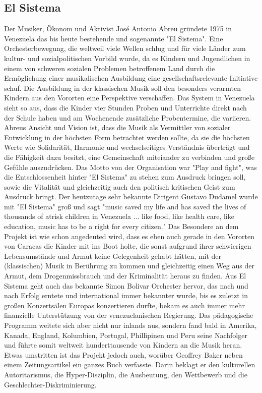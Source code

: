 \subsection{El Sistema}
Der Musiker, Ökonom und Aktivist José Antonio Abreu gründete 1975 in Venezuela
das bis heute bestehende und sogenannte "El Sistema". Eine Orchesterbewegung,
die weltweil viele Wellen schlug und für viele Länder zum kultur- und
sozialpolitischen Vorbild wurde, da es Kindern und Jugendlichen in einem von
schweren sozialen Problemen betroffenem Land durch die Ermöglichung einer
musikalischen Ausbildung eine gesellschaftsrelevante
Initiative schuf.
Die Ausbildung in der klassischen Musik soll den besonders verarmten Kindern aus den Vororten
eine Perspektive verschaffen. Das System in Venezuela sieht so aus, dass die
Kinder vier Stunden Proben und Unterrichte direkt nach der Schule haben und am
Wochenende zusätzliche Probentermine, die variieren. Abreus Ansicht und Vision ist, dass die
Musik als Vermittler von sozialer Entwicklung in der höchsten Form betrachtet
werden sollte, da sie die höchsten Werte wie Solidarität, Harmonie und
wechselseitiges Verständnis überträgt und die Fähigkeit dazu besitzt, eine
Gemeinschaft miteiander zu verbinden und große Gefühle auszudrücken. Das Motto
von der Organisation war "Play and fight", was die Entschlossenheit hinter "El
Sistema" zu stehen zum Ausdruck bringen soll, sowie die Vitalität und
gleichzeitig auch den politisch kritischen Geist zum Ausdruck bringt. Der
heutzutage sehr bekannte Dirigent Gustavo Dudamel wurde mit "El Sistema" groß
und sagt "music saved my life and has saved the lives of thousands of atrisk
children in Venezuela ... like food, like health care, like education, music has
to be a right for every citizen."%
Das Besondere an dem Projekt ist wie schon angedeuted wird, dass es eben auch
gerade in den Vororten von Caracas die Kinder mit ins Boot holte, die sonst
aufgrund ihrer schwierigen Lebensumstände und Armut keine Gelegenheit gehabt
hätten, mit der (klassischen) Musik in Berührung zu kommen und gleichzeitig
einen Weg aus der Armut, dem Drogenmissbrauch und der Kriminalität heraus zu
finden. Aus El Sistema geht auch das bekannte Simon Bolivar Orchester hervor,
das nach und nach Erfolg erntete und international
immer bekannter wurde, bis es zuletzt in großen Konzertsälen Europas
konzertieren durfte, bekam es auch immer mehr finanzielle Unterstützung von der
venezuelanischen Regierung. Das pädagogische Programm weitete sich aber nicht
nur inlands aus, sondern fand bald in Amerika, Kanada, England, Kolumbien,
Portugal, Phillipinen und Peru seine Nachfolger und führte somit weltweit
hunderttausende von Kindern an die Musik heran. Etwas umstritten ist das Projekt
jedoch auch, worüber Geoffrey Baker neben einem Zeitungsartikel ein ganzes
Buch verfasste. Darin beklagt er den kulturellen Autoritarismus, die
Hyper-Disziplin, die Ausbeutung, den Wettbewerb und die
Geschlechter-Diskriminierung. 


